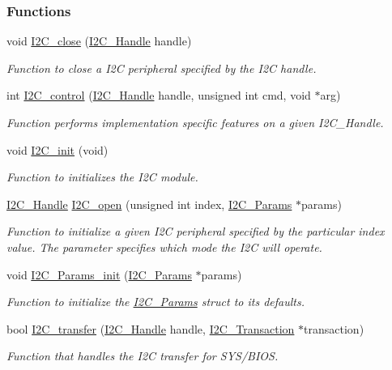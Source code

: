 \subsubsection*{Functions}
\begin{DoxyCompactItemize}
\item 
void \hyperlink{_i2_c_8h_a12c86d89a687f2ee1eb980d99c32326d}{I2\+C\+\_\+close} (\hyperlink{_i2_c_8h_a5809a229f8395c87f59e63128195c1bf}{I2\+C\+\_\+\+Handle} handle)
\begin{DoxyCompactList}\small\item\em Function to close a I2\+C peripheral specified by the I2\+C handle. \end{DoxyCompactList}\item 
int \hyperlink{_i2_c_8h_a633003582213a5098467a4e647cc52f9}{I2\+C\+\_\+control} (\hyperlink{_i2_c_8h_a5809a229f8395c87f59e63128195c1bf}{I2\+C\+\_\+\+Handle} handle, unsigned int cmd, void $\ast$arg)
\begin{DoxyCompactList}\small\item\em Function performs implementation specific features on a given I2\+C\+\_\+\+Handle. \end{DoxyCompactList}\item 
void \hyperlink{_i2_c_8h_a9ff51ddf1d325776fef90cce0223772b}{I2\+C\+\_\+init} (void)
\begin{DoxyCompactList}\small\item\em Function to initializes the I2\+C module. \end{DoxyCompactList}\item 
\hyperlink{_i2_c_8h_a5809a229f8395c87f59e63128195c1bf}{I2\+C\+\_\+\+Handle} \hyperlink{_i2_c_8h_ae1aa99e1fee4517406018e10025cca0e}{I2\+C\+\_\+open} (unsigned int index, \hyperlink{struct_i2_c___params}{I2\+C\+\_\+\+Params} $\ast$params)
\begin{DoxyCompactList}\small\item\em Function to initialize a given I2\+C peripheral specified by the particular index value. The parameter specifies which mode the I2\+C will operate. \end{DoxyCompactList}\item 
void \hyperlink{_i2_c_8h_ab11636302074d67180207ab81ceb323c}{I2\+C\+\_\+\+Params\+\_\+init} (\hyperlink{struct_i2_c___params}{I2\+C\+\_\+\+Params} $\ast$params)
\begin{DoxyCompactList}\small\item\em Function to initialize the \hyperlink{struct_i2_c___params}{I2\+C\+\_\+\+Params} struct to its defaults. \end{DoxyCompactList}\item 
bool \hyperlink{_i2_c_8h_ac5d827b67fe77d7d179026941cc069d7}{I2\+C\+\_\+transfer} (\hyperlink{_i2_c_8h_a5809a229f8395c87f59e63128195c1bf}{I2\+C\+\_\+\+Handle} handle, \hyperlink{struct_i2_c___transaction}{I2\+C\+\_\+\+Transaction} $\ast$transaction)
\begin{DoxyCompactList}\small\item\em Function that handles the I2\+C transfer for S\+Y\+S/\+B\+I\+O\+S. \end{DoxyCompactList}\end{DoxyCompactItemize}


